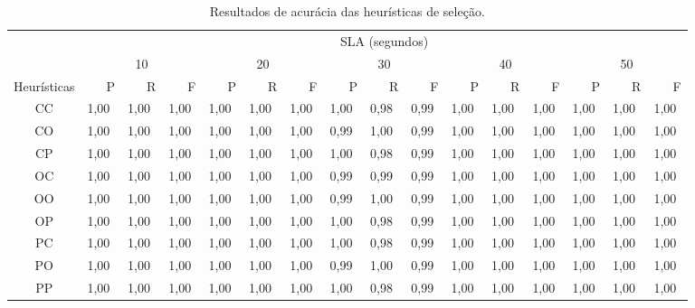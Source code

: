\documentclass[12pt]{article}
\begin{document}
\begin{table}[t]
   \centering\scriptsize
   \caption{\label{table:acuracia_capacidade}Resultados de acurácia das heurísticas de seleção.}
    \begin{tabular}{cm{.8em}m{.8em}m{1.4em}m{.8em}m{.8em}m{1.4em}m{.8em}m{.8em}m{1.4em}m{.8em}m{.8em}m{1.4em}m{.8em}m{.8em}m{.8em}}
    \toprule
     & \multicolumn{15}{c}{SLA (segundos)} \\
    \cline{2-16}
          & \multicolumn{3}{c}{10} & \multicolumn{3}{c}{20} & \multicolumn{3}{c}{30} & \multicolumn{3}{c}{40} & \multicolumn{3}{c}{50} \\
          \cline{2-16}
          \multicolumn{1}{c}{Heurísticas} & ~~~P     & ~~~R     & ~~~F     & ~~~P     & ~~~R     & ~~~F     & ~~~P     & ~~~R     & ~~~F     & ~~~P     & ~~~R     & ~~~F     & ~~~P     & ~~~R     & ~~~F \\
          \midrule          
    CC    & 1,00  & 1,00  & 1,00  & 1,00  & 1,00  & 1,00  & 1,00  & {\color{red}0,98}  & {\color{red}0,99}  & 1,00  & 1,00  & 1,00  & 1,00  & 1,00  & 1,00 \\
    CO    & 1,00  & 1,00  & 1,00  & 1,00  & 1,00  & 1,00  & {\color{red}0,99}  & 1,00  & {\color{red}0,99}  & 1,00  & 1,00  & 1,00  & 1,00  & 1,00  & 1,00 \\
    CP    & 1,00  & 1,00  & 1,00  & 1,00  & 1,00  & 1,00  & 1,00  & {\color{red}0,98}  & {\color{red}0,99}  & 1,00  & 1,00  & 1,00  & 1,00  & 1,00  & 1,00 \\
    OC    & 1,00  & 1,00  & 1,00  & 1,00  & 1,00  & 1,00  & {\color{red}0,99}  & {\color{red}0,99}  & {\color{red}0,99}  & 1,00  & 1,00  & 1,00  & 1,00  & 1,00  & 1,00 \\
    OO    & 1,00  & 1,00  & 1,00  & 1,00  & 1,00  & 1,00  & {\color{red}0,99}  & 1,00  & {\color{red}0,99}  & 1,00  & 1,00  & 1,00  & 1,00  & 1,00  & 1,00 \\
    OP    & 1,00  & 1,00  & 1,00  & 1,00  & 1,00  & 1,00  & 1,00  & {\color{red}0,98}  & {\color{red}0,99}  & 1,00  & 1,00  & 1,00  & 1,00  & 1,00  & 1,00 \\
    PC    & 1,00  & 1,00  & 1,00  & 1,00  & 1,00  & 1,00  & 1,00  & {\color{red}0,98}  & {\color{red}0,99}  & 1,00  & 1,00  & 1,00  & 1,00  & 1,00  & 1,00 \\
    PO    & 1,00  & 1,00  & 1,00  & 1,00  & 1,00  & 1,00  & {\color{red}0,99}  & 1,00  & {\color{red}0,99}  & 1,00  & 1,00  & 1,00  & 1,00  & 1,00  & 1,00 \\
    PP    & 1,00  & 1,00  & 1,00  & 1,00  & 1,00  & 1,00  & 1,00  & {\color{red}0,98}  & {\color{red}0,99}  & 1,00  & 1,00  & 1,00  & 1,00  & 1,00  & 1,00 \\
    \toprule
    \end{tabular}%
 \end{table}%
\end{document}
